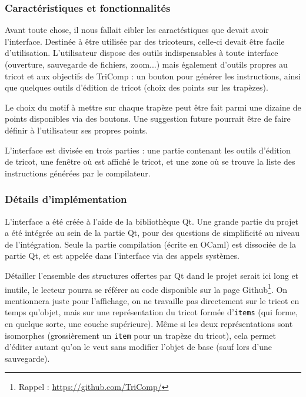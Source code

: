 \documentclass{article}
\begin{document}
\subsubsection{Caractéristiques et fonctionnalités}

Avant toute chose, il nous fallait cibler les caractéstiques que
devait avoir l'interface. Destinée à être utilisée par des tricoteurs,
celle-ci devait être facile d'utilisation. L'utilisateur dispose des
outils indispensables à toute interface (ouverture, sauvegarde de
fichiers, zoom...) mais également d'outils propres au tricot et aux
objectifs de TriComp : un bouton pour générer les instructions, ainsi
que quelques outils d'édition de tricot (choix des points sur les
trapèzes).

Le choix du motif à mettre sur chaque trapèze peut être fait parmi une
dizaine de points disponibles via des boutons. Une suggestion future
pourrait être de faire définir à l'utilisateur ses propres points.

L'interface est divisée en trois parties : une partie contenant les
outils d'édition de tricot, une fenêtre où est affiché le tricot, et
une zone où se trouve la liste des instructions générées par le
compilateur.




\subsubsection{Détails d'implémentation}

L'interface a été créée à l'aide de la bibliothèque Qt. Une grande
partie du projet a été intégrée au sein de la partie Qt, pour des
questions de simplificité au niveau de l'intégration. Seule la partie
compilation (écrite en OCaml) est dissociée de la partie Qt, et est
appelée dans l'interface via des appels systèmes.

Détailler l'ensemble des structures offertes par Qt dand le projet
serait ici long et inutile, le lecteur pourra se référer au code
disponible sur la page Github\footnote{Rappel :
  \url{https://github.com/TriComp/}}. On mentionnera juste pour
l'affichage, on ne travaille pas directement sur le tricot en temps
qu'objet, mais sur une représentation du tricot formée
d'\texttt{items} (qui forme, en quelque sorte, une couche
supérieure). Même si les deux représentations sont isomorphes
(grossièrement un \texttt{item} pour un trapèze du tricot), cela
permet d'éditer autant qu'on le veut sans modifier l'objet de base
(sauf lors d'une sauvegarde).
\end{document}

